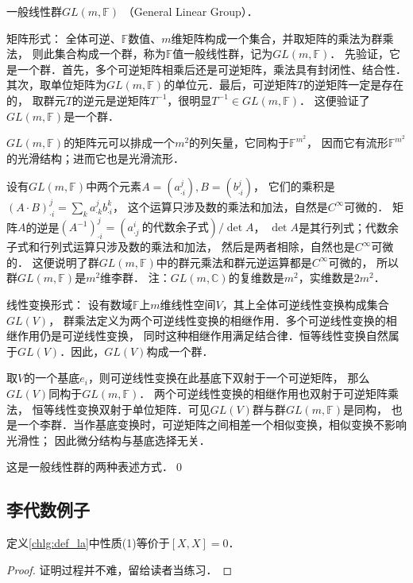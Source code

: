 \begin{example}\label{chlg:exm_GL}
    一般线性群$GL(m,\mathbb{F})$ （General Linear Group）．
\end{example}
{\heiti 矩阵形式}：
全体可逆、$\mathbb{F}$数值、$m$维矩阵构成一个集合，并取矩阵的乘法为群乘法，
则此集合构成一个群，称为$\mathbb{F}$值{\heiti 一般线性群}，记为$GL(m,\mathbb{F})$．
先验证，它是一个群．首先，多个可逆矩阵相乘后还是可逆矩阵，乘法具有封闭性、结合性．
其次，取单位矩阵为$GL(m,\mathbb{F})$的单位元．最后，可逆矩阵$T$的逆矩阵一定是存在的，
取群元$T$的逆元是逆矩阵$T^{-1}$，很明显$T^{-1}\in GL(m,\mathbb{F})$．
这便验证了$GL(m,\mathbb{F})$是一个群．

$GL(m,\mathbb{F})$的矩阵元可以排成一个$m^2$的列矢量，它同构于$\mathbb{F}^{m^2}$，
因而它有流形$\mathbb{F}^{m^2}$的光滑结构；进而它也是光滑流形．


设有$GL(m,\mathbb{F})$中两个元素$A=(a^j_{\cdot i}), B=(b^j_{\cdot i})$，
它们的乘积是$(A\cdot B)^{j}_{\cdot i} = \sum_{k} a^j_{\cdot k} b^k_{\cdot i}$，
这个运算只涉及数的乘法和加法，自然是$C^\infty$可微的．
矩阵$A$的逆是$(A^{-1})^{j}_{\cdot i}=(a^{i}_{\cdot j}\ \text{的代数余子式})/\det A$，
$\det A$是其行列式；代数余子式和行列式运算只涉及数的乘法和加法，
然后是两者相除，自然也是$C^\infty$可微的．
这便说明了群$GL(m,\mathbb{F})$中的群元乘法和群元逆运算都是$C^\infty$可微的，
所以群$GL(m,\mathbb{F})$是$m^2$维{\kaishu 李群}．
注：$GL(m,\mathbb{C})$的复维数是$m^2$，实维数是$2m^2$．

{\heiti 线性变换形式}：
设有数域$\mathbb{F}$上$m$维线性空间$V$，其上全体可逆线性变换构成集合$GL(V)$，
群乘法定义为两个可逆线性变换的相继作用．多个可逆线性变换的相继作用仍是可逆线性变换，
同时这种相继作用满足结合律．恒等线性变换自然属于$GL(V)$．因此，$GL(V)$构成一个群．

取$V$的一个基底$e_i$，则可逆线性变换在此基底下双射于一个可逆矩阵，
那么$GL(V)$同构于$GL(m,\mathbb{F})$．
两个可逆线性变换的相继作用也双射于可逆矩阵乘法，
恒等线性变换双射于单位矩阵．可见$GL(V)$群与群$GL(m,\mathbb{F})$是同构，
也是一个李群．当作基底变换时，可逆矩阵之间相差一个相似变换，相似变换不影响光滑性；
因此微分结构与基底选择无关．

这是一般线性群的两种表述方式．\qed



\subsection{李代数例子}

\begin{proposition}
    定义\ref{chlg:def_la}中性质(1)等价于$[X,X]=0$．
\end{proposition}
\begin{proof}
	证明过程并不难，留给读者当练习．
\end{proof}


